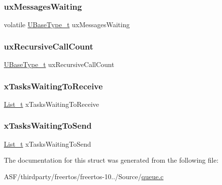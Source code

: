 \mbox{\label{struct_queue_definition_afb61b3f2247402ed3b8b159311c408b7}} 
\subsubsection{\texorpdfstring{uxMessagesWaiting}{uxMessagesWaiting}}
{\footnotesize\ttfamily volatile \mbox{\hyperlink{portmacro_8h_a646f89d4298e4f5afd522202b11cb2e6}{U\+Base\+Type\+\_\+t}} ux\+Messages\+Waiting}

\mbox{\label{struct_queue_definition_ae3c791284df4f19b849e56f972b13db4}} 
\subsubsection{\texorpdfstring{uxRecursiveCallCount}{uxRecursiveCallCount}}
{\footnotesize\ttfamily \mbox{\hyperlink{portmacro_8h_a646f89d4298e4f5afd522202b11cb2e6}{U\+Base\+Type\+\_\+t}} ux\+Recursive\+Call\+Count}

\mbox{\label{struct_queue_definition_a8ad185d9d83713c774e6a897580d8313}} 
\subsubsection{\texorpdfstring{xTasksWaitingToReceive}{xTasksWaitingToReceive}}
{\footnotesize\ttfamily \mbox{\hyperlink{list_8h_afd590ef6400071b4d63d65ef90bea7f4}{List\+\_\+t}} x\+Tasks\+Waiting\+To\+Receive}

\mbox{\label{struct_queue_definition_a5cfd8ae6db5da134ed16405043a0d898}} 
\subsubsection{\texorpdfstring{xTasksWaitingToSend}{xTasksWaitingToSend}}
{\footnotesize\ttfamily \mbox{\hyperlink{list_8h_afd590ef6400071b4d63d65ef90bea7f4}{List\+\_\+t}} x\+Tasks\+Waiting\+To\+Send}



The documentation for this struct was generated from the following file\+:\begin{DoxyCompactItemize}
\item 
A\+S\+F/thirdparty/freertos/freertos-\/10../\+Source/\mbox{\hyperlink{queue_8c}{queue.\+c}}\end{DoxyCompactItemize}
